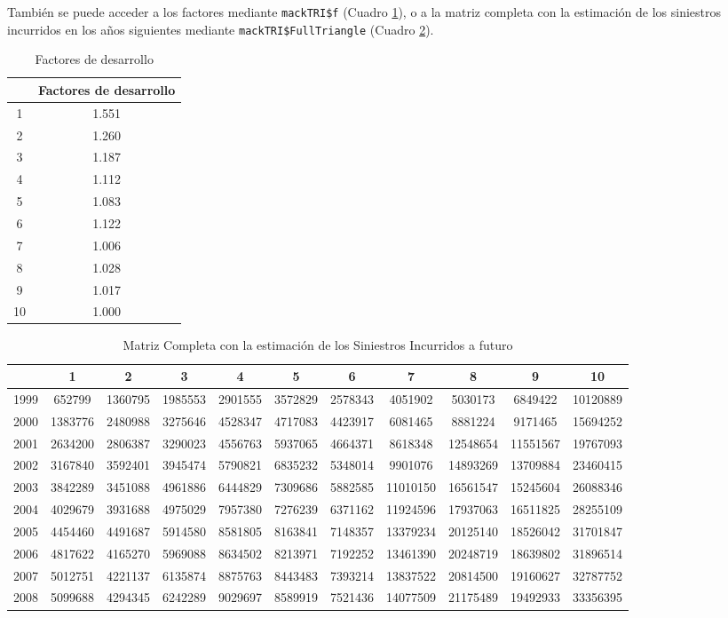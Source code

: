 \documentclass[
  12pt,
]{article}
\begin{document}
También se puede acceder a los factores mediante \texttt{mackTRI\$f}
(Cuadro \ref{factores}), o a la matriz completa con la estimación de los
siniestros incurridos en los años siguientes mediante
\texttt{mackTRI\$FullTriangle} (Cuadro \ref{fulltriangle}).

\begin{table}[ht]
\centering
\caption{Factores de desarrollo} 
\label{factores}
\begin{tabular}{cc}
  \hline
 & Factores de desarrollo \\ 
  \hline
1 & 1.551 \\ 
  2 & 1.260 \\ 
  3 & 1.187 \\ 
  4 & 1.112 \\ 
  5 & 1.083 \\ 
  6 & 1.122 \\ 
  7 & 1.006 \\ 
  8 & 1.028 \\ 
  9 & 1.017 \\ 
  10 & 1.000 \\ 
   \hline
\end{tabular}
\end{table}

\begin{table}[ht]
\centering
\caption{Matriz Completa con la estimación de los Siniestros Incurridos a futuro} 
\label{fulltriangle}
\begingroup\fontsize{8.2pt}{10pt}\selectfont
\begin{tabular}{lcccccccccc}
  \hline
 & 1 & 2 & 3 & 4 & 5 & 6 & 7 & 8 & 9 & 10 \\ 
  \hline
1999 & 652799 & 1360795 & 1985553 & 2901555 & 3572829 & 2578343 & 4051902 & 5030173 & 6849422 & 10120889 \\ 
  2000 & 1383776 & 2480988 & 3275646 & 4528347 & 4717083 & 4423917 & 6081465 & 8881224 & 9171465 & 15694252 \\ 
  2001 & 2634200 & 2806387 & 3290023 & 4556763 & 5937065 & 4664371 & 8618348 & 12548654 & 11551567 & 19767093 \\ 
  2002 & 3167840 & 3592401 & 3945474 & 5790821 & 6835232 & 5348014 & 9901076 & 14893269 & 13709884 & 23460415 \\ 
  2003 & 3842289 & 3451088 & 4961886 & 6444829 & 7309686 & 5882585 & 11010150 & 16561547 & 15245604 & 26088346 \\ 
  2004 & 4029679 & 3931688 & 4975029 & 7957380 & 7276239 & 6371162 & 11924596 & 17937063 & 16511825 & 28255109 \\ 
  2005 & 4454460 & 4491687 & 5914580 & 8581805 & 8163841 & 7148357 & 13379234 & 20125140 & 18526042 & 31701847 \\ 
  2006 & 4817622 & 4165270 & 5969088 & 8634502 & 8213971 & 7192252 & 13461390 & 20248719 & 18639802 & 31896514 \\ 
  2007 & 5012751 & 4221137 & 6135874 & 8875763 & 8443483 & 7393214 & 13837522 & 20814500 & 19160627 & 32787752 \\ 
  2008 & 5099688 & 4294345 & 6242289 & 9029697 & 8589919 & 7521436 & 14077509 & 21175489 & 19492933 & 33356395 \\ 
   \hline
\end{tabular}
\endgroup
\end{table}
\end{document}
